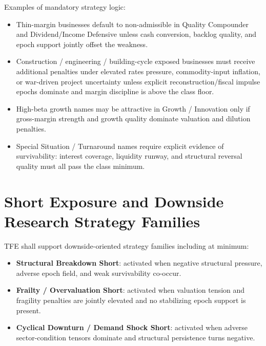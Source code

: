 Examples of mandatory strategy logic:
\begin{itemize}
    \item Thin-margin businesses default to non-admissible in Quality Compounder and Dividend/Income Defensive unless cash conversion, backlog quality, and epoch support jointly offset the weakness.
    \item Construction / engineering / building-cycle exposed businesses must receive additional penalties under elevated rates pressure, commodity-input inflation, or war-driven project uncertainty unless explicit reconstruction/fiscal impulse epochs dominate and margin discipline is above the class floor.
    \item High-beta growth names may be attractive in Growth / Innovation only if gross-margin strength and growth quality dominate valuation and dilution penalties.
    \item Special Situation / Turnaround names require explicit evidence of survivability: interest coverage, liquidity runway, and structural reversal quality must all pass the class minimum.
\end{itemize}



\section{Short Exposure and Downside Research Strategy Families}

TFE shall support downside-oriented strategy families including at minimum:
\begin{itemize}
    \item \textbf{Structural Breakdown Short}: activated when negative structural pressure, adverse epoch field, and weak survivability co-occur.
    \item \textbf{Frailty / Overvaluation Short}: activated when valuation tension and fragility penalties are jointly elevated and no stabilizing epoch support is present.
    \item \textbf{Cyclical Downturn / Demand Shock Short}: activated when adverse sector-condition tensors dominate and structural persistence turns negative.
\end{itemize}

